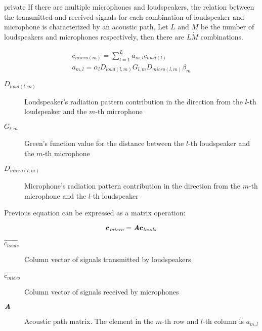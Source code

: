 \begin{shownto}{private}
If there are multiple microphones and loudspeakers, the relation between the transmitted and received signals for each combination of loudspeaker and microphone is characterized by an acoustic path. Let $L$ and $M$ be the number of loudspeakers and microphones respectively, then there are $L \dot M$ combinations.

\begin{gather}
c_{\mathit{micro} (m)} = \sum_{l = 1}^{L} a_{m,l} c_{\mathit{loud} (l)} \label{transEquationCalibrationConcrete} \\
a_{m,l} = \alpha_l D_{loud(l,m)} G_{l,m} D_{micro(l,m)} \beta_m
\label{acPathTheoric}
\end{gather}

\begin{description}
	\item[$D_{loud(l,m)}$] Loudspeaker's radiation pattern contribution in the direction from the $l$-th loudspeaker and the $m$-th microphone
	\item[$G_{l,m}$] Green's function value for the distance between the $l$-th loudspeaker and the $m$-th microphone
	\item[$D_{micro(l,m)}$] Microphone's radiation pattern contribution in the direction from the $m$-th microphone and the $l$-th loudspeaker
\end{description}

Previous equation can be expressed as a matrix operation:

\begin{equation}
\mathbf{c_\mathit{micro}} = \bm{\mathit{A}} \mathbf{c_\mathit{louds}}
\label{transEqMatrix}
\end{equation}

\begin{description}
	\item[$\vec{c_\mathit{louds}}$] Column vector of signals transmitted by loudspeakers
 	\item[$\vec{c_\mathit{micro}}$] Column vector of signals received by microphones
	\item[$\bm{\mathit{A}}$] Acoustic path matrix. The element in the $m$-th row and $l$-th column is $a_{m,l}$
\end{description}
\end{shownto}

